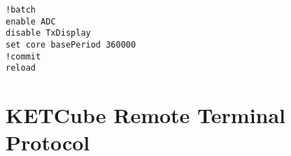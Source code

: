 \begin{Verbatim}[frame=single, fontsize=\small]
!batch
enable ADC
disable TxDisplay
set core basePeriod 360000
!commit
reload
\end{Verbatim}


\clearpage 
\section{KETCube Remote Terminal Protocol}
  
  




  




